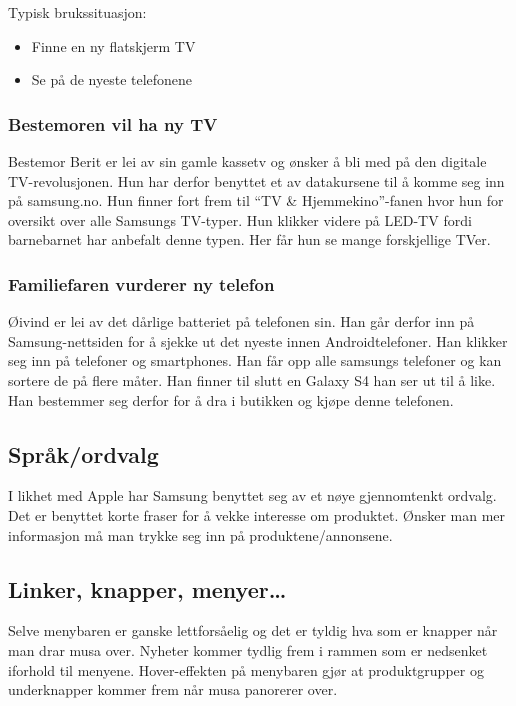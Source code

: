 Typisk brukssituasjon: 

\begin{itemize}
\item Finne en ny flatskjerm TV
\item Se på de nyeste telefonene
\end{itemize}

\subsubsection{Bestemoren vil ha ny TV}

Bestemor Berit er lei av sin gamle kassetv og ønsker å bli med på den digitale TV-revolusjonen. Hun har derfor benyttet et av datakursene til å komme seg inn på samsung.no. Hun finner fort frem til ``TV \& Hjemmekino''-fanen hvor hun for oversikt over alle Samsungs TV-typer. Hun klikker videre på LED-TV fordi barnebarnet har anbefalt denne typen. Her får hun se mange forskjellige TVer.  

\subsubsection{Familiefaren vurderer ny telefon}

Øivind er lei av det dårlige batteriet på telefonen sin. Han går derfor inn på Samsung-nettsiden for å sjekke ut det nyeste innen Androidtelefoner. Han klikker seg inn på telefoner og smartphones. Han får opp alle samsungs telefoner og kan sortere de på flere måter. Han finner til slutt en Galaxy S4 han ser ut til å like. Han bestemmer seg derfor for å dra i butikken og kjøpe denne telefonen. 

\subsection{Språk/ordvalg}

I likhet med Apple har Samsung benyttet seg av et nøye gjennomtenkt ordvalg. Det er benyttet korte fraser for å vekke interesse om produktet. Ønsker man mer informasjon må man trykke seg inn på produktene/annonsene.  

\subsection{Linker, knapper, menyer\dots}

Selve menybaren er ganske lettforsåelig og det er tyldig hva som er knapper når man drar musa over. Nyheter kommer tydlig frem i rammen som er nedsenket iforhold til menyene. Hover-effekten på menybaren gjør at produktgrupper og underknapper kommer frem når musa panorerer over. 


